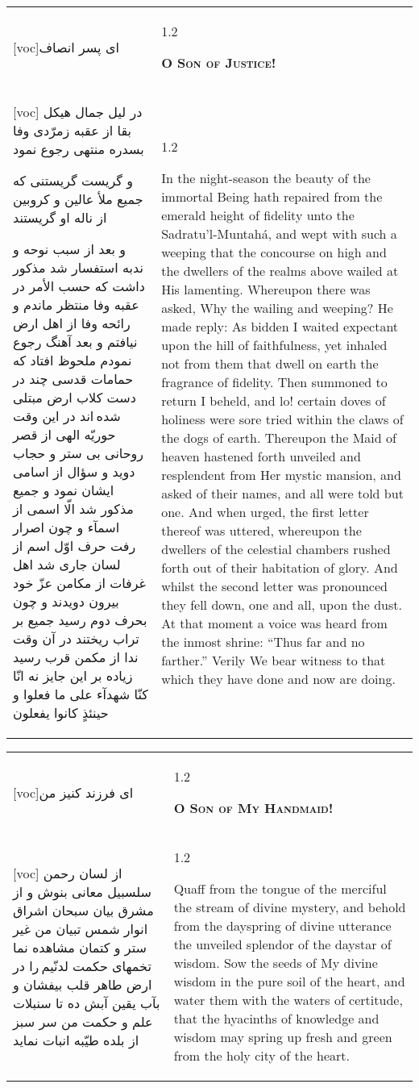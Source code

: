 \documentclass[11pt]{article}
\makeatletter
\newenvironment{orig}
  {\begin{farsi}[voc]}
  {\end{farsi}}
\newenvironment{trans}
  {\Large\begin{spacing}{1.2}\raggedright}
  {\end{spacing}}
\newenvironment{word}
  {\begin{tabular}[t]{p{2.75in}@{\hspace{3em}}p{2.75in}}}
  {\end{tabular}}
\newcommand{\ayat}[2]{\begin{orig}#1\end{orig} & \begin{trans}#2\end{trans}}
\newcommand{\heading}[2]{\textsc{\textbf{#1}} %
}
\makeatother
\begin{document}
\begin{word}
\ayat{ای پسر انصاف}{\heading{O Son of Justice!}{}} \\ \ayat{
در ليل جمال هيکل بقا از عقبه زمرّدی وفا بسدره منتهی رجوع نمود

و گريست گريستنی که جميع ملأ عالين و کروبين از ناله او گريستند

و بعد از سبب نوحه و ندبه استفسار شد مذکور داشت که حسب الأمر در عقبه وفا منتظر ماندم و رائحه وفا از اهل ارض نيافتم و بعد آهنگ رجوع نمودم ملحوظ افتاد که حمامات قدسی چند در دست کلاب ارض مبتلی شده اند
در اين وقت حوريّه الهی از قصر روحانی بی ستر و حجاب دويد و سؤال از اسامی ايشان نمود و جميع مذکور شد الّا اسمی از اسمآء
و چون اصرار رفت حرف اوّل اسم از لسان جاری شد اهل غرفات از مکامن عزّ خود بيرون دويدند و چون بحرف دوم رسيد جميع بر تراب ريختند در آن وقت ندا از مکمن قرب رسيد زياده بر اين جايز نه انّا کنّا شهدآء علی ما فعلوا و حينئذٍ کانوا يفعلون
}{
  In the night-season the beauty of the immortal Being hath repaired from the
  emerald height of fidelity unto the Sadratu'l-Muntahá, and wept with such a
  weeping that the concourse on high and the dwellers of the realms above
  wailed at His lamenting. Whereupon there was asked, Why the wailing and
  weeping? He made reply: As bidden I waited expectant upon the hill of
  faithfulness, yet inhaled not from them that dwell on earth the fragrance of
  fidelity. Then summoned to return I beheld, and lo! certain doves of
  holiness were sore tried within the claws of the dogs of earth. Thereupon
  the Maid of heaven hastened forth unveiled and resplendent from Her mystic
  mansion, and asked of their names, and all were told but one. And when
  urged, the first letter thereof was uttered, whereupon the dwellers of the
  celestial chambers rushed forth out of their habitation of glory. And whilst
  the second letter was pronounced they fell down, one and all, upon the dust.
  At that moment a voice was heard from the inmost shrine: ``Thus far and no
  farther.'' Verily We bear witness to that which they have done and now are
  doing.
}
\end{word}

\pagebreak

\begin{word}
\ayat{ای فرزند کنيز من}{\heading{O Son of My Handmaid!}{}} \\ \ayat{
از لسان رحمن سلسبيل معانی بنوش و از مشرق بيان سبحان اشراق انوار شمس تبيان من غير ستر و کتمان مشاهده نما
تخمهای حکمت لدنّيم را در ارض طاهر قلب بيفشان و بآب يقين آبش ده تا سنبلات علم و حکمت من سر سبز از بلده طيّبه انبات نمايد
}{
  Quaff from the tongue of the merciful the stream of divine mystery, and
  behold from the dayspring of divine utterance the unveiled splendor of the
  daystar of wisdom. Sow the seeds of My divine wisdom in the pure soil of the
  heart, and water them with the waters of certitude, that the hyacinths of
  knowledge and wisdom may spring up fresh and green from the holy city of the
  heart.
}
\end{word}
\end{document}
